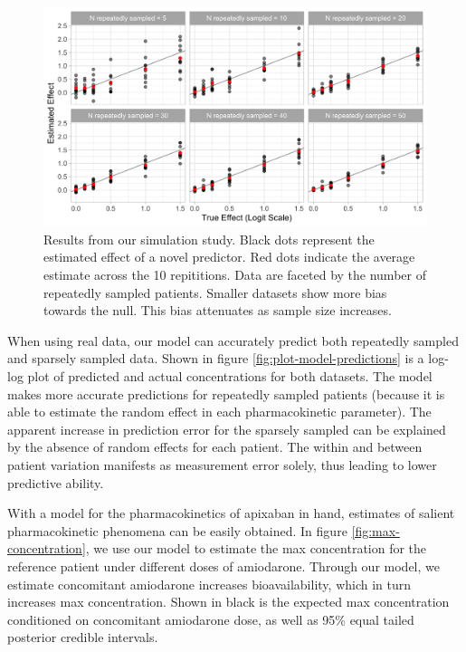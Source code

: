 \begin{figure}
	
	{\centering \includegraphics[width=\linewidth]{figures/simulation-results-1} 
		
	}
	
	\caption{Results from our simulation study.  Black dots represent the estimated effect of a novel predictor.  Red dots indicate the average estimate across the 10 repititions. Data are faceted by the number of repeatedly sampled patients.  Smaller datasets show more bias towards the null.  This bias attenuates as sample size increases.}\label{fig:simulation-results}
\end{figure}


When using real data, our model can accurately predict both repeatedly
sampled and sparsely sampled data. Shown in figure
\ref{fig:plot-model-predictions} is a log-log plot of predicted and
actual concentrations for both datasets. The model makes more accurate
predictions for repeatedly sampled patients (because it is able to
estimate the random effect in each pharmacokinetic parameter). The
apparent increase in prediction error for the sparsely sampled can be
explained by the absence of random effects for each patient. The within
and between patient variation manifests as measurement error solely,
thus leading to lower predictive ability.

With a model for the pharmacokinetics of apixaban in hand, estimates of
salient pharmacokinetic phenomena can be easily obtained. In figure
\ref{fig:max-concentration}, we use our model to estimate the max
concentration for the reference patient under different doses of
amiodarone. Through our model, we estimate concomitant amiodarone
increases bioavailability, which in turn increases max concentration.
Shown in black is the expected max concentration conditioned on
concomitant amiodarone dose, as well as 95\% equal tailed posterior
credible intervals.

